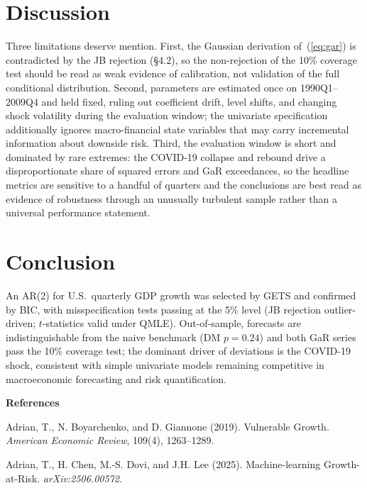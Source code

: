 \documentclass[12pt]{article}
\begin{document}




\section{Discussion}

Three limitations deserve mention.
First, the Gaussian derivation of~(\ref{eq:gar}) is contradicted by the JB rejection (\S4.2), so the non-rejection of the 10\% coverage test should be read as weak evidence of calibration, not validation of the full conditional distribution.
\newline
Second, parameters are estimated once on 1990Q1--2009Q4 and held fixed, ruling out coefficient drift, level shifts, and changing shock volatility during the evaluation window; the univariate specification additionally ignores macro-financial state variables that may carry incremental information about downside risk.
\newline
Third, the evaluation window is short and dominated by rare extremes: the COVID-19 collapse and rebound drive a disproportionate share of squared errors and GaR exceedances, so the headline metrics are sensitive to a handful of quarters and the conclusions are best read as evidence of robustness through an unusually turbulent sample rather than a universal performance statement.




\section{Conclusion}

An AR(2) for U.S.\ quarterly GDP growth was selected by GETS and confirmed by BIC, with misspecification tests passing at the 5\% level (JB rejection outlier-driven; $t$-statistics valid under QMLE). Out-of-sample, forecasts are indistinguishable from the naive benchmark (DM $p=0.24$) and both GaR series pass the 10\% coverage test; the dominant driver of deviations is the COVID-19 shock, consistent with simple univariate models remaining competitive in macroeconomic forecasting and risk quantification.

\bigskip
\noindent\textbf{References}

\noindent Adrian, T., N. Boyarchenko, and D. Giannone (2019). Vulnerable Growth. \textit{American Economic Review}, 109(4), 1263--1289.

\noindent Adrian, T., H. Chen, M.-S. Dovi, and J.H. Lee (2025). Machine-learning Growth-at-Risk. \textit{arXiv:2506.00572}.
\end{document}
